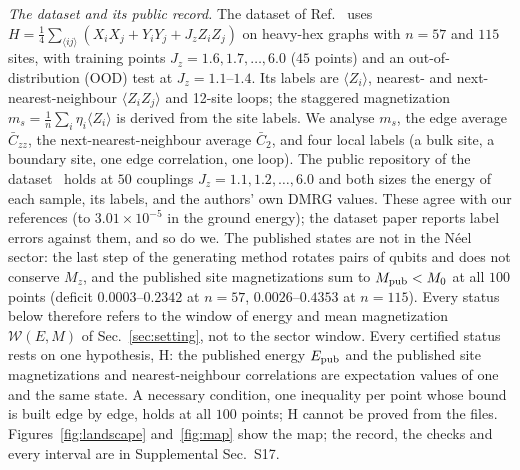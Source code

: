 \documentclass[aps,prx,twocolumn,10pt,superscriptaddress,nofootinbib,longbibliography,floatfix]{revtex4-2}
\theoremstyle{remark}
\newcommand{\Jz}{J_z}
\newcommand{\ms}{m_s}
\newcommand{\Czz}{\bar C_{zz}}
\newcommand{\Ctwo}{\bar C_{2}}
\newcommand{\W}{\mathcal{W}}
\begin{document}
\emph{The dataset and its public record.} The dataset of Ref.~\cite{jaderberg2026} uses
$H=\frac14\sum_{\langle ij\rangle}(X_iX_j+Y_iY_j+\Jz Z_iZ_j)$ on heavy-hex graphs with $n=57$ and $115$ sites, with
training points $\Jz=1.6,1.7,\dots,6.0$ ($45$ points) and an out-of-distribution (OOD) test at $\Jz=1.1$--$1.4$. %
Its labels are $\langle Z_i\rangle$, nearest- and next-nearest-neighbour $\langle Z_iZ_j\rangle$ and 12-site loops; the %
staggered magnetization $\ms=\frac1n\sum_i\eta_i\langle Z_i\rangle$ is derived from the site labels. We analyse $\ms$,
the edge average $\Czz$, the next-nearest-neighbour average $\Ctwo$, and four local labels (a bulk site, a boundary
site, one edge correlation, one loop). The public repository of the dataset~\cite{jaderberg2026data} holds at $50$ couplings $\Jz=1.1,1.2,\dots,6.0$ and both sizes the %
energy of each sample, its labels, and the authors' own DMRG values. These agree with our references (to
$3.01\times10^{-5}$ in the ground energy); the dataset paper reports label errors against them, and so do we. %
The published states are not in the N\'eel sector: the last step of the generating method rotates pairs of qubits and does not conserve $M_z$, and the published site magnetizations
sum to $M_{\rm pub}<M_0$ at all $100$ points (deficit $0.0003$--$0.2342$ at $n=57$, $0.0026$--$0.4353$ at $n=115$). %
Every status below therefore refers to the window of energy and mean magnetization $\W(E,M)$ of
Sec.~\ref{sec:setting}, not to the sector window. Every certified status rests on one hypothesis, H: the published
energy $E_{\rm pub}$ and the published site magnetizations and nearest-neighbour correlations are expectation values
of one and the same state. A necessary condition, one inequality per point whose bound is built edge by edge, holds
at all $100$ points; H cannot be proved from the files. Figures~\ref{fig:landscape} %
and~\ref{fig:map} show the map; the record, the checks and every interval are in Supplemental Sec.~S17.
\end{document}
